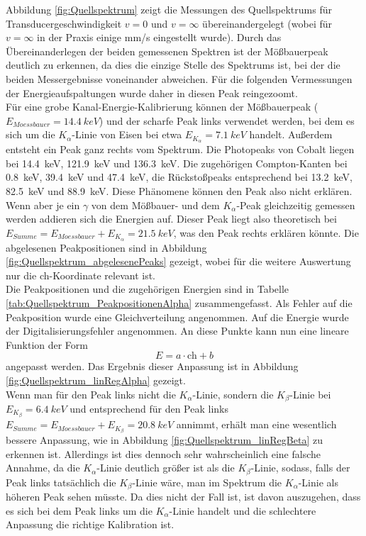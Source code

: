 \documentclass[12pt,a4paper]{article}
\begin{document}
Abbildung \ref{fig:Quellspektrum} zeigt die Messungen des Quellspektrums für Transducergeschwindigkeit $v = 0$ und $v = \infty$ übereinandergelegt (wobei für $v = \infty$ in der Praxis einige mm/s eingestellt wurde). Durch das Übereinanderlegen der beiden gemessenen Spektren ist der Mößbauerpeak deutlich zu erkennen, da dies die einzige Stelle des Spektrums ist, bei der die beiden Messergebnisse voneinander abweichen. Für die folgenden Vermessungen der Energieaufspaltungen wurde daher in diesen Peak reingezoomt.\\
Für eine grobe Kanal-Energie-Kalibrierung können der Mößbauerpeak ($E_{Moessbauer} = \SI{14,4}{keV}$) und der scharfe Peak links verwendet werden, bei dem es sich um die $K_{\alpha}$-Linie von Eisen bei etwa $E_{K_{\alpha}} = \SI{7,1}{keV}$ handelt. Außerdem entsteht ein Peak ganz rechts vom Spektrum.  Die Photopeaks von Cobalt liegen bei \SI{14,4}{keV}, \SI{121,9}{keV} und \SI{136,3}{keV}. Die zugehörigen Compton-Kanten bei \SI{0,8}{keV}, \SI{39,4}{keV} und \SI{47,4}{keV}, die Rückstoßpeaks entsprechend bei \SI{13,2}{keV}, \SI{82,5}{keV} und \SI{88,9}{keV}. Diese Phänomene können den Peak also nicht erklären. Wenn aber je ein $\gamma$ von dem Mößbauer- und dem $K_{\alpha}$-Peak gleichzeitig gemessen werden addieren sich die Energien auf. Dieser Peak liegt also theoretisch bei $E_{Summe} = E_{Moessbauer} + E_{K_{\alpha}} = \SI{21,5}{keV}$, was den Peak rechts erklären könnte. Die abgelesenen Peakpositionen sind in Abbildung \ref{fig:Quellspektrum_abgelesenePeaks} gezeigt, wobei für die weitere Auswertung nur die ch-Koordinate relevant ist. \\
Die Peakpositionen und die zugehörigen Energien sind in Tabelle \ref{tab:Quellspektrum_PeakpositionenAlpha} zusammengefasst. Als Fehler auf die Peakposition wurde eine Gleichverteilung angenommen. Auf die Energie wurde der Digitalisierungsfehler angenommen. An diese Punkte kann nun eine lineare Funktion der Form
\begin{equation*}
E = a \cdot \textrm{ch} + b
\end{equation*}
angepasst werden. Das Ergebnis dieser Anpassung ist in Abbildung \ref{fig:Quellspektrum_linRegAlpha} gezeigt.\\
Wenn man für den Peak links nicht die $K_{\alpha}$-Linie, sondern die $K_{\beta}$-Linie bei $E_{K_{\beta}} = \SI{6,4}{keV}$ und entsprechend für den Peak links $E_{Summe} = E_{Moessbauer} + E_{K_{\beta}} = \SI{20,8}{keV}$ annimmt, erhält man eine wesentlich bessere Anpassung, wie in Abbildung \ref{fig:Quellspektrum_linRegBeta} zu erkennen ist. Allerdings ist dies dennoch sehr wahrscheinlich eine falsche Annahme, da die $K_{\alpha}$-Linie deutlich größer ist als die $K_{\beta}$-Linie, sodass, falls der Peak links tatsächlich die $K_{\beta}$-Linie wäre, man im Spektrum die $K_{\alpha}$-Linie als höheren Peak sehen müsste. Da dies nicht der Fall ist, ist davon auszugehen, dass es sich bei dem Peak links um die $K_{\alpha}$-Linie handelt und die schlechtere Anpassung die richtige Kalibration ist.\\
\end{document}
